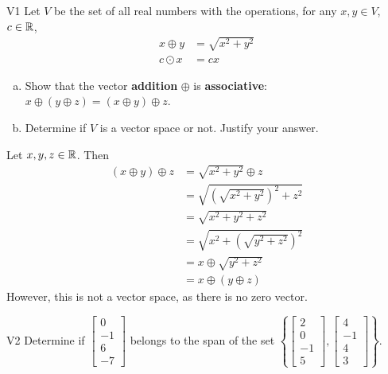 \documentclass{sbgLAsemi}
\begin{document}
\begin{problem}{V1}
Let $V$ be the set of all real numbers with the operations, for any $x, y \in V$, $c \in \mathbb{R}$,
\begin{align*}
x \oplus y &= \sqrt{x^2+y^2} \\
c \odot x &= c x
\end{align*}
\begin{enumerate}[(a)]
\item Show that the vector \textbf{addition} $\oplus$ is \textbf{associative}:
      \(x \oplus (y \oplus z)=(x\oplus y)\oplus z\).
\item Determine if $V$ is a vector space or not.  Justify your answer.
\end{enumerate}
\end{problem}
\begin{solution}
Let $x,y,z \in \mathbb{R}$.  Then
\begin{align*}
(x\oplus y) \oplus z &= \sqrt{x^2+y^2} \oplus z \\&= \sqrt{ (\sqrt{x^2+y^2})^2+z^2} \\&= \sqrt{x^2+y^2+z^2} \\
&= \sqrt{x^2+(\sqrt{y^2+z^2})^2} \\ &= x \oplus \sqrt{y^2+z^2} \\ &= x \oplus (y \oplus z)
\end{align*}
However, this is not a vector space, as there is no zero vector.
\end{solution}
\begin{problem}{V2}
  Determine if
  \(\begin{bmatrix} 0 \\ -1 \\ 6 \\ -7 \end{bmatrix}\)
  belongs to the span of the set
  \(\left\{
    \begin{bmatrix} 2 \\ 0 \\ -1 \\ 5 \end{bmatrix},
    \begin{bmatrix} 4 \\ -1 \\ 4 \\ 3 \end{bmatrix}
    \right\}
  \).
\end{problem}
\end{document}
